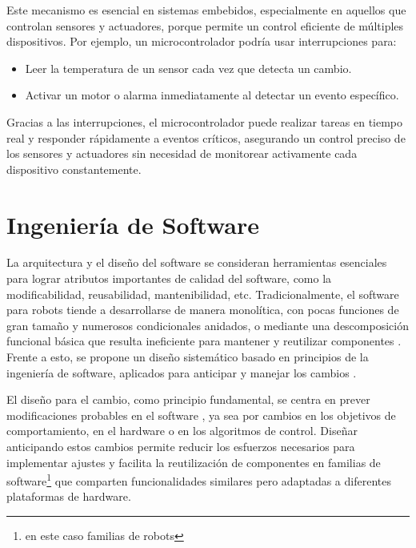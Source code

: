 Este mecanismo es esencial en sistemas embebidos, especialmente en aquellos que controlan sensores y actuadores, porque permite un control eficiente de múltiples dispositivos. Por ejemplo, un microcontrolador podría usar interrupciones para:

\begin{itemize}
    \item Leer la temperatura de un sensor cada vez que detecta un cambio.
    \item Activar un motor o alarma inmediatamente al detectar un evento específico.
\end{itemize}

Gracias a las interrupciones, el microcontrolador puede realizar tareas en tiempo real y responder rápidamente a eventos críticos, asegurando un control preciso de los sensores y actuadores sin necesidad de monitorear activamente cada dispositivo constantemente.


\section{Ingeniería de Software}
\label{ingso}

La arquitectura y el diseño del software se consideran herramientas esenciales para lograr atributos importantes de calidad del software, como la modificabilidad, reusabilidad, mantenibilidad, etc.\cite{ShawGarlan1996, ghezzi2003, bass2003, DBLP:books/daglib/0030743}
Tradicionalmente, el software para robots tiende a desarrollarse de manera monolítica, con pocas funciones de gran tamaño y numerosos condicionales anidados, o mediante una descomposición funcional básica que resulta ineficiente para mantener y reutilizar componentes \cite{code-1,code-2}. Frente a esto, se propone un diseño sistemático basado en principios de la ingeniería de software, aplicados para anticipar y manejar los cambios \cite{Gamma:1995:DPE:186897, DBLP:books/lib/BuschmannHS07}.

El diseño para el cambio, como principio fundamental, se centra en prever modificaciones probables en el software \cite{Parnas1972, ShawGarlan1996, ghezzi2003, bass2003, DBLP:books/daglib/0030743}, ya sea por cambios en los objetivos de comportamiento, en el hardware o en los algoritmos de control. Diseñar anticipando estos cambios permite reducir los esfuerzos necesarios para implementar ajustes y facilita la reutilización de componentes en familias de software\footnote{en este caso familias de robots} que comparten funcionalidades similares pero adaptadas a diferentes plataformas de hardware\cite{Parnas02, DBLP:books/daglib/0019719}.

